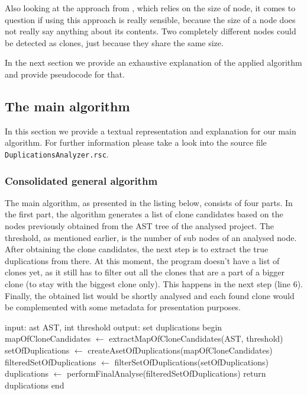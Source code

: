 \documentclass{uva-inf-article}
\begin{document}
Also looking at the approach from \cite{baxter1998clone}, which relies on the size of node, it comes to question if using this approach is really sensible, because the size of a node does not really say anything about its contents. Two completely different nodes could be detected as clones, just because they share the same size.

In the next section we provide an exhaustive explanation of the applied algorithm and provide pseudocode for that. 

\subsection{The main algorithm}\label{main_alg}

In this section we provide a textual representation and explanation for our main algorithm. For further information please take a look into the source file \texttt{DuplicationsAnalyzer.rsc}.

\subsubsection{Consolidated general algorithm}

The main algorithm, as presented in the listing below, consists of four parts. In the first part, the algorithm generates a list of clone candidates based on the nodes previously obtained from the AST tree of the analysed project. The threshold, as mentioned earlier, is the number of sub nodes of an analysed node. After obtaining the clone candidates, the next step is to extract the true duplications from there. At this moment, the program doesn't have a list of clones yet, as it still has to filter out all the clones that are a part of a bigger clone (to stay with the biggest clone only). This happens in the next step (line 6). Finally, the obtained list would be shortly analysed and each found clone would be complemented with some metadata for presentation purposes. 

\begin{pseudocode}[caption={Consolidated general algorithm.}, label={alg0}]
 input: ast AST, int threshold
 output: set duplications
 begin
  mapOfCloneCandidates $\gets$ extractMapOfCloneCandidates(AST, threshold)
  setOfDuplications $\gets$ createAsetOfDuplications(mapOfCloneCandidates)
  filteredSetOfDuplications $\gets$ filterSetOfDuplications(setOfDuplications)
  duplications $\gets$ performFinalAnalyse(filteredSetOfDuplications)
  return duplications
 end       
\end{pseudocode}
\end{document}
